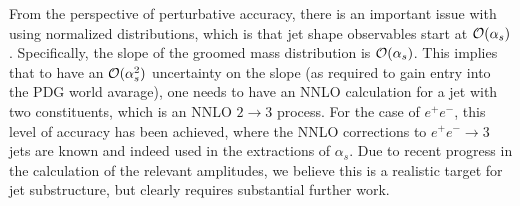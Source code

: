 From the perspective of perturbative accuracy, there is an important issue with using normalized distributions, which is that jet shape observables start at ${\mathcal O}(\alpha_s)$.
%
Specifically, the slope of the groomed mass distribution is ${\mathcal O}(\alpha_s)$.
%
This implies that to have an ${\mathcal O}(\alpha_s^2)$ uncertainty on the slope (as required to gain entry into the PDG world avarage), one needs to have an NNLO calculation for a jet with two constituents, which is an NNLO $2 \to 3$ process.  
%
For the case of $e^+e^-$, this level of accuracy has been achieved, where the NNLO corrections to $e^+e^-\to 3$ jets are known and indeed used in the extractions of $\alpha_s$.
%
Due to recent progress in the calculation of the relevant amplitudes, we believe this is a realistic target for jet substructure, but clearly requires substantial further work.

































